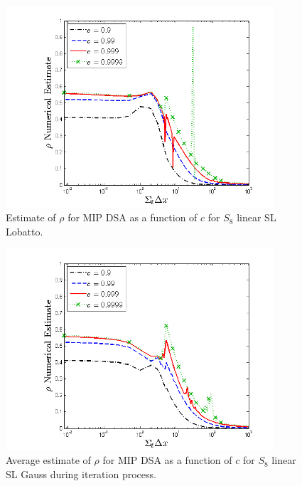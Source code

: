 %
\begin{figure}[!htp]
\centering
\includegraphics[width=10cm]{chapter4_acceleration/Const_2_Constant_XS_c_comparions_MIP_Lobatto.png}
\caption{Estimate of $\rho$ for MIP DSA as a function of $c$  for  $S_8$  linear SL Lobatto.}
\label{fig:mip_lobatto_as_fun_c}
\end{figure}
%
\begin{figure}[!hbp]
\centering
\includegraphics[width=10cm]{chapter4_acceleration/Const_2_bar_Constant_XS_c_comparions_MIP_Gauss.png}
\caption{Average estimate of $\rho$ for MIP DSA as a function of $c$  for  $S_8$  linear SL Gauss during iteration process.}
\label{fig:mip_gauss_as_fun_c_bar}
\end{figure}


